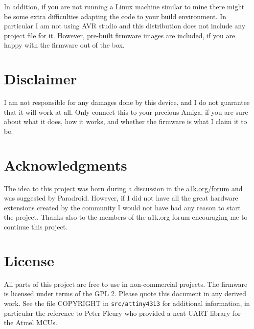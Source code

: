 \documentclass[DIV10]{scrartcl}
\begin{document}
In addition, if you are not running a Linux machine similar to mine
there might be some extra difficulties adapting the code to your build
environment. In particular I am not using AVR studio and this
distribution does not include any project file for it. However,
pre-built firmware images are included, if you are happy with the
firmware out of the box.

\section{Disclaimer}
I am not responsible for any damages done by this device, and I do not
guarantee that it will work at all. Only connect this to your precious
Amiga, if you are sure about what it does, how it works, and whether
the firmware is what I claim it to be.

\section{Acknowledgments}
The idea to this project was born during a discussion in the
\url{a1k.org/forum} and was suggested by Paradroid. However, if I did
not have all the great hardware extensions created by the community
I would not have had any reason to start the project. Thanks also to
the members of the a1k.org forum encouraging me to continue this project.

\section{License}
All parts of this project are free to use in non-commercial
projects. The firmware is licensed under terms of the GPL 2. Please
quote this document in any derived work. See the file COPYRIGHT in
\verb#src/attiny4313# for additional information, in particular the
reference to Peter Fleury who provided a neat UART library for the
Atmel MCUs.
\end{document}
